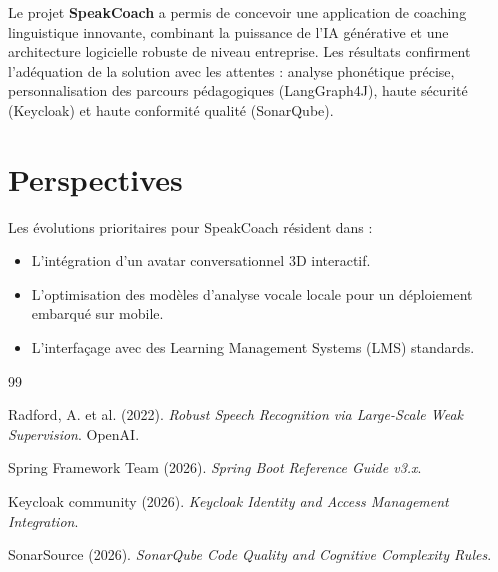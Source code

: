 \documentclass[12pt,a4paper]{report}
\begin{document}
Le projet \textbf{SpeakCoach} a permis de concevoir une application de coaching linguistique innovante, combinant la puissance de l'IA générative et une architecture logicielle robuste de niveau entreprise. Les résultats confirment l'adéquation de la solution avec les attentes : analyse phonétique précise, personnalisation des parcours pédagogiques (LangGraph4J), haute sécurité (Keycloak) et haute conformité qualité (SonarQube).

\section*{Perspectives}

Les évolutions prioritaires pour SpeakCoach résident dans :
\begin{itemize}[leftmargin=2cm]
    \item L'intégration d'un avatar conversationnel 3D interactif.
    \item L'optimisation des modèles d'analyse vocale locale pour un déploiement embarqué sur mobile.
    \item L'interfaçage avec des Learning Management Systems (LMS) standards.
\end{itemize}

\begin{thebibliography}{99}

 Radford, A. et al. (2022). \textit{Robust Speech Recognition via Large-Scale Weak Supervision}. OpenAI.

 Spring Framework Team (2026). \textit{Spring Boot Reference Guide v3.x}.

 Keycloak community (2026). \textit{Keycloak Identity and Access Management Integration}.

 SonarSource (2026). \textit{SonarQube Code Quality and Cognitive Complexity Rules}.

\end{thebibliography}
\end{document}
